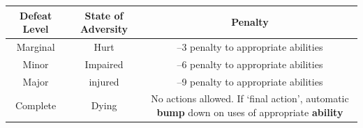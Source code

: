 \documentclass[
]{article}
\begin{document}
\begin{longtable}[]{@{}ccc@{}}
\toprule
\begin{minipage}[b]{0.09\columnwidth}\centering
Defeat Level\strut
\end{minipage} & \begin{minipage}[b]{0.13\columnwidth}\centering
State of Adversity\strut
\end{minipage} & \begin{minipage}[b]{0.70\columnwidth}\centering
Penalty\strut
\end{minipage}\tabularnewline
\midrule
\endhead
\begin{minipage}[t]{0.09\columnwidth}\centering
Marginal\strut
\end{minipage} & \begin{minipage}[t]{0.13\columnwidth}\centering
Hurt\strut
\end{minipage} & \begin{minipage}[t]{0.70\columnwidth}\centering
--3 penalty to appropriate abilities\strut
\end{minipage}\tabularnewline
\begin{minipage}[t]{0.09\columnwidth}\centering
Minor\strut
\end{minipage} & \begin{minipage}[t]{0.13\columnwidth}\centering
Impaired\strut
\end{minipage} & \begin{minipage}[t]{0.70\columnwidth}\centering
--6 penalty to appropriate abilities\strut
\end{minipage}\tabularnewline
\begin{minipage}[t]{0.09\columnwidth}\centering
Major\strut
\end{minipage} & \begin{minipage}[t]{0.13\columnwidth}\centering
injured\strut
\end{minipage} & \begin{minipage}[t]{0.70\columnwidth}\centering
--9 penalty to appropriate abilities\strut
\end{minipage}\tabularnewline
\begin{minipage}[t]{0.09\columnwidth}\centering
Complete\strut
\end{minipage} & \begin{minipage}[t]{0.13\columnwidth}\centering
Dying\strut
\end{minipage} & \begin{minipage}[t]{0.70\columnwidth}\centering
No actions allowed. If `final action', automatic \textbf{bump} down on
uses of appropriate \textbf{ability}\strut
\end{minipage}\tabularnewline
\bottomrule
\end{longtable}
\end{document}
